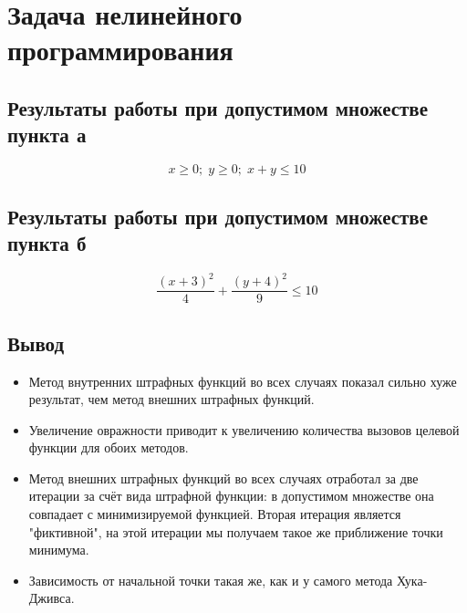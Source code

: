 \documentclass[12pt, a4paper]{article}
\begin{document}
%
\section{Задача нелинейного программирования}

\subsection{Результаты работы при допустимом множестве пункта а}

\[
x \ge 0;\; y \ge 0;\; x+y \le 10
\]



\vspace*{1cm}

\subsection{Результаты работы при допустимом множестве пункта б}

\[
\dfrac{(x+3)^2}{4} + \dfrac{(y+4)^2}{9} \le 10
\]



\vspace*{1cm}

\subsection{Вывод}

\begin{itemize}
	\item Метод внутренних штрафных функций во всех случаях показал сильно хуже результат, чем метод внешних штрафных функций.
	\item Увеличение овражности приводит к увеличению количества вызовов целевой функции для обоих методов.
	\item Метод внешних штрафных функций во всех случаях отработал за две итерации за счёт вида штрафной функции: в допустимом множестве она совпадает с минимизируемой функцией. Вторая итерация является "фиктивной", на этой итерации мы получаем такое же приближение точки минимума.
	\item Зависимость от начальной точки такая же, как и у самого метода Хука-Дживса.
\end{itemize}

\newpage
\end{document}

